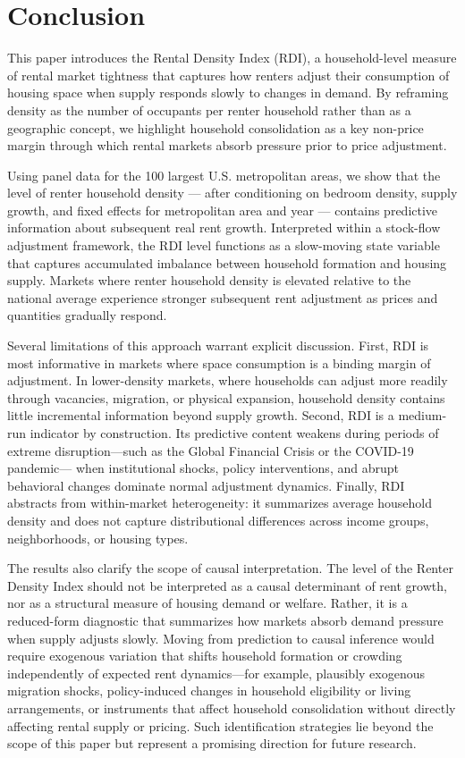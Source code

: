 \documentclass[pdflatex,sn-apa]{sn-jnl}%
\theoremstyle{thmstyleone}%
\theoremstyle{thmstyletwo}%
\theoremstyle{thmstylethree}%
\begin{document}
\section{Conclusion}\label{section6}

This paper introduces the Rental Density Index (RDI), a household-level measure of
rental market tightness that captures how renters adjust their consumption of housing
space when supply responds slowly to changes in demand. By reframing density as the
number of occupants per renter household rather than as a geographic concept, we
highlight household consolidation as a key non-price margin through which rental
markets absorb pressure prior to price adjustment.

Using panel data for the 100 largest U.S. metropolitan areas, we show that the level of renter household density — after conditioning on bedroom density, supply growth, and fixed effects for metropolitan area and year — contains predictive information about subsequent real rent growth. Interpreted within a stock-flow adjustment framework, the RDI level functions as a slow-moving state variable that captures accumulated imbalance between household formation and housing supply. Markets where renter household density is elevated relative to the national average experience stronger subsequent rent adjustment as prices and quantities gradually respond.

Several limitations of this approach warrant explicit discussion. First, RDI is most
informative in markets where space consumption is a binding margin of adjustment.
In lower-density markets, where households
can adjust more readily through vacancies, migration, or physical expansion, household
density contains little incremental information beyond supply growth. Second, RDI is a
medium-run indicator by construction. Its predictive content weakens during periods of
extreme disruption—such as the Global Financial Crisis or the COVID-19 pandemic—
when institutional shocks, policy interventions, and abrupt behavioral changes dominate
normal adjustment dynamics. Finally, RDI abstracts from within-market heterogeneity:
it summarizes average household density and does not capture distributional differences
across income groups, neighborhoods, or housing types.

The results also clarify the scope of causal interpretation. The level of the Renter Density Index should not
be interpreted as a causal determinant of rent growth, nor as a structural measure of
housing demand or welfare. Rather, it is a reduced-form diagnostic that summarizes how
markets absorb demand pressure when supply adjusts slowly. Moving from prediction to
causal inference would require exogenous variation that shifts household formation or
crowding independently of expected rent dynamics—for example, plausibly exogenous
migration shocks, policy-induced changes in household eligibility or living
arrangements, or instruments that affect household consolidation without directly
affecting rental supply or pricing. Such identification strategies lie beyond the scope
of this paper but represent a promising direction for future research.
\end{document}
